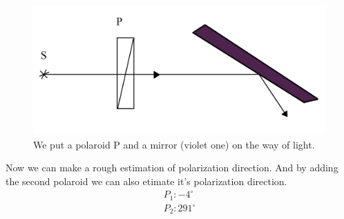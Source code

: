 \begin{minipage}{0.55\textwidth}
    \begin{figure}[h]
    \centering
    \includegraphics[width=1\textwidth]{images/mirror.png}
    \caption{We put a polaroid P and a mirror (violet one) on the way of light.}
\end{figure}
\end{minipage}
\hfill
\begin{minipage}{0.35\textwidth}
	Now we can make a rough estimation of polarization direction. And by adding the second polaroid we can also etimate it's polarization direction.
	\begin{align*}
		&P_1 \colon -4^\circ&\\
		&P_2 \colon 291^\circ&
	\end{align*}
\end{minipage}

